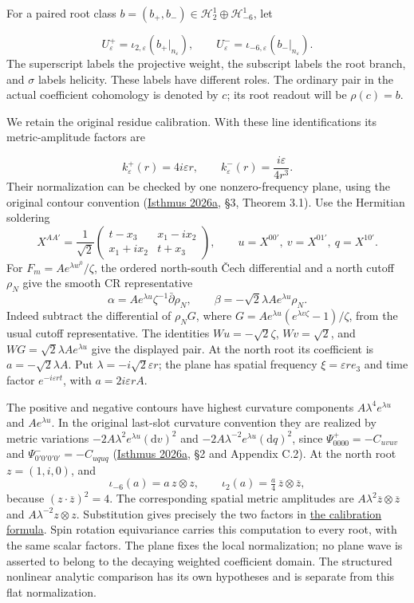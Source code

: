 \documentclass[
  english,
  11pt,
  reqno]{amsart}
\begin{document}
For a paired root class
\(b=(b_+,b_-)\in\mathscr H_2^1\oplus\mathscr H_{-6}^1\), let

\label{eq:online-root-raw-tensors} \[
U^+_\varepsilon=\iota_{2,\varepsilon}(b_+|_{n_\varepsilon}),
\qquad
U^-_\varepsilon=\iota_{-6,\varepsilon}(b_-|_{n_\varepsilon}).
\] The superscript labels the projective weight, the subscript labels
the root branch, and \(\sigma\) labels helicity. These labels have
different roles. The ordinary pair in the actual coefficient cohomology
is denoted by \(c\); its root readout will be \(\rho(c)=b\).

We retain the original residue calibration. With these line
identifications its metric-amplitude factors are

\label{eq:online-root-calibration-factors} \[
k^+_\varepsilon(r)=4i\varepsilon r,
\qquad
k^-_\varepsilon(r)=\frac{i\varepsilon}{4r^3}.
\] Their normalization can be checked by one nonzero-frequency plane,
using the original contour convention
(\hyperref[ref-IsthmusLocal2026]{Isthmus 2026a}, §3, Theorem 3.1). Use
the Hermitian soldering \[
X^{AA'}=\frac1{\sqrt2}
\begin{pmatrix}t-x_3&x_1-ix_2\\x_1+ix_2&t+x_3\end{pmatrix},
\qquad
u=X^{00'},\ v=X^{01'},\ q=X^{10'}.
\] For \(F_m=Ae^{\lambda w^0}/\zeta\), the ordered north-south Čech
differential and a north cutoff \(\rho_N\) give the smooth CR
representative \[
\alpha=Ae^{\lambda u}\zeta^{-1}\bar\partial\rho_N,
\qquad
\beta=-\sqrt2\lambda Ae^{\lambda u}\rho_N.
\] Indeed subtract the differential of \(\rho_NG\), where
\(G=Ae^{\lambda u}(e^{\lambda v\zeta}-1)/\zeta\), from the usual cutoff
representative. The identities \(Wu=-\sqrt2\zeta\), \(Wv=\sqrt2\), and
\(WG=\sqrt2\lambda Ae^{\lambda u}\) give the displayed pair. At the
north root its coefficient is \(a=-\sqrt2\lambda A\). Put
\(\lambda=-i\sqrt2\varepsilon r\); the plane has spatial frequency
\(\xi=\varepsilon re_3\) and time factor \(e^{-i\varepsilon rt}\), with
\(a=2i\varepsilon rA\).

The positive and negative contours have highest curvature components
\(A\lambda^4e^{\lambda u}\) and \(Ae^{\lambda u}\). In the original
last-slot curvature convention they are realized by metric variations
\(-2A\lambda^2e^{\lambda u}(\mathrm dv)^2\) and
\(-2A\lambda^{-2}e^{\lambda u}(\mathrm dq)^2\), since
\(\Psi^+_{0000}=-C_{uvuv}\) and \(\Psi^-_{0'0'0'0'}=-C_{uquq}\)
(\hyperref[ref-IsthmusLocal2026]{Isthmus 2026a}, §2 and Appendix C.2).
At the north root \(z=(1,i,0)\), and \[
\iota_{-6}(a)=a\,z\otimes z,
\qquad
\iota_2(a)=\tfrac a4\,\overline z\otimes\overline z,
\] because \((z\cdot\overline z)^2=4\). The corresponding spatial metric
amplitudes are \(A\lambda^2\overline z\otimes\overline z\) and
\(A\lambda^{-2}z\otimes z\). Substitution gives precisely the two
factors in \hyperref[eq:online-root-calibration-factors]{the calibration
formula}. Spin rotation equivariance carries this computation to every
root, with the same scalar factors. The plane fixes the local
normalization; no plane wave is asserted to belong to the decaying
weighted coefficient domain. The structured nonlinear analytic
comparison has its own hypotheses and is separate from this flat
normalization.
\end{document}
